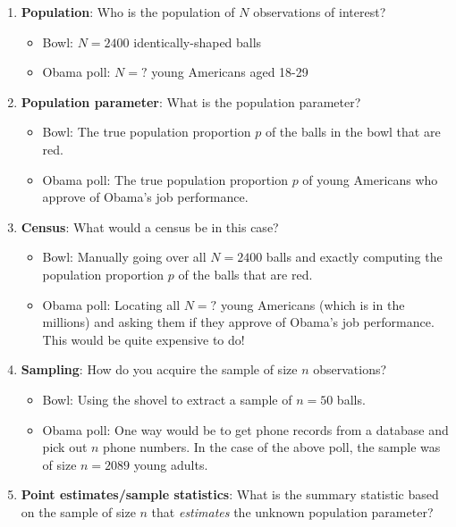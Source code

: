 \documentclass[12pt,]{krantz}
\providecommand{\tightlist}{%
  \setlength{\itemsep}{0pt}\setlength{\parskip}{0pt}}
\theoremstyle{definition}
\theoremstyle{definition}
\theoremstyle{definition}
\theoremstyle{remark}
\begin{document}
\begin{enumerate}
\def\labelenumi{\arabic{enumi}.}
\tightlist
\item
  \textbf{Population}: Who is the population of \(N\) observations of
  interest?

  \begin{itemize}
  \tightlist
  \item
    Bowl: \(N=2400\) identically-shaped balls
  \item
    Obama poll: \(N = \text{?}\) young Americans aged 18-29
  \end{itemize}
\item
  \textbf{Population parameter}: What is the population parameter?

  \begin{itemize}
  \tightlist
  \item
    Bowl: The true population proportion \(p\) of the balls in the bowl
    that are red.
  \item
    Obama poll: The true population proportion \(p\) of young Americans
    who approve of Obama's job performance.
  \end{itemize}
\item
  \textbf{Census}: What would a census be in this case?

  \begin{itemize}
  \tightlist
  \item
    Bowl: Manually going over all \(N=2400\) balls and exactly computing
    the population proportion \(p\) of the balls that are red.
  \item
    Obama poll: Locating all \(N = \text{?}\) young Americans (which is
    in the millions) and asking them if they approve of Obama's job
    performance. This would be quite expensive to do!
  \end{itemize}
\item
  \textbf{Sampling}: How do you acquire the sample of size \(n\)
  observations?

  \begin{itemize}
  \tightlist
  \item
    Bowl: Using the shovel to extract a sample of \(n=50\) balls.
  \item
    Obama poll: One way would be to get phone records from a database
    and pick out \(n\) phone numbers. In the case of the above poll, the
    sample was of size \(n=2089\) young adults.
  \end{itemize}
\item
  \textbf{Point estimates/sample statistics}: What is the summary
  statistic based on the sample of size \(n\) that \emph{estimates} the
  unknown population parameter?


\end{enumerate}
\end{document}
